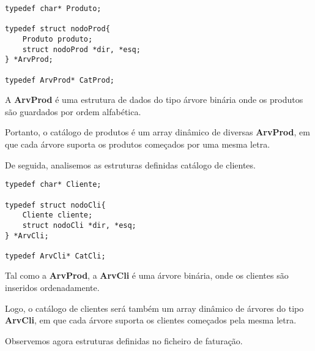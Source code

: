 \documentclass{article}
\begin{document}
\begin{lstlisting}
typedef char* Produto;

typedef struct nodoProd{
	Produto produto;
	struct nodoProd *dir, *esq;
} *ArvProd;

typedef ArvProd* CatProd;
\end{lstlisting}

A \textbf{ArvProd} é uma estrutura de dados do tipo árvore binária onde os produtos são guardados por ordem alfabética. 

Portanto, o catálogo de produtos é um array dinâmico de diversas \textbf{ArvProd}, em que cada árvore suporta os produtos começados por uma mesma letra.

De seguida, analisemos as estruturas definidas catálogo de clientes.
\\

\begin{lstlisting}
typedef char* Cliente;

typedef struct nodoCli{
	Cliente cliente;
	struct nodoCli *dir, *esq;
} *ArvCli;

typedef ArvCli* CatCli;
\end{lstlisting}

Tal como a \textbf{ArvProd}, a \textbf{ArvCli} é uma árvore binária, onde os clientes são inseridos ordenadamente.

Logo, o catálogo de clientes será também um array dinâmico de árvores do tipo \textbf{ArvCli}, em que cada árvore suporta os clientes começados pela mesma letra.

Observemos agora estruturas definidas no ficheiro de faturação.
\\
\end{document}
